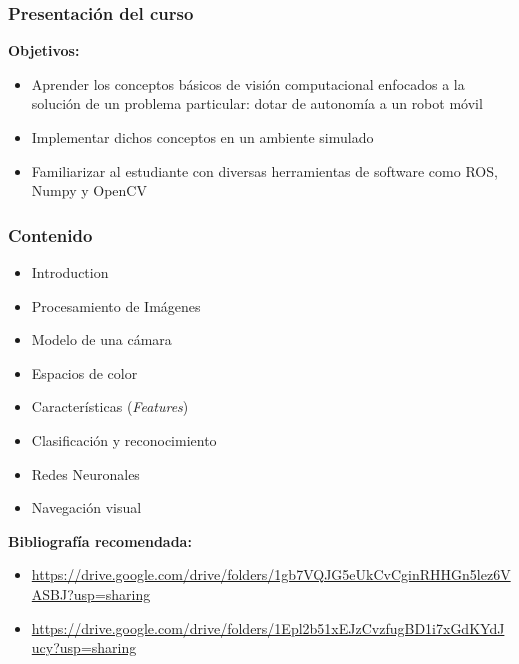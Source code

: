 \begin{frame}\frametitle{Presentación del curso}
  \textbf{Objetivos:}
  \begin{itemize}
  \item Aprender los conceptos básicos de visión computacional enfocados a la solución de un problema particular: dotar de autonomía a un robot móvil
  \item Implementar dichos conceptos en un ambiente simulado
  \item Familiarizar al estudiante con diversas herramientas de software como ROS, Numpy y OpenCV
  \end{itemize}
\end{frame}


\begin{frame}\frametitle{Contenido}
  \begin{itemize}
  \item Introduction
  \item Procesamiento de Imágenes
  \item Modelo de una cámara
  \item Espacios de color
  \item Características (\textit{Features})
  \item Clasificación y reconocimiento
  \item Redes Neuronales
  \item Navegación visual 
  \end{itemize}
  \[\]
  \textbf{Bibliografía recomendada:}
  \begin{itemize}
  \item \url{https://drive.google.com/drive/folders/1gb7VQJG5eUkCvCginRHHGn5lez6VASBJ?usp=sharing}
  \item \url{https://drive.google.com/drive/folders/1Epl2b51xEJzCvzfugBD1i7xGdKYdJucy?usp=sharing}
  \end{itemize}
\end{frame}

